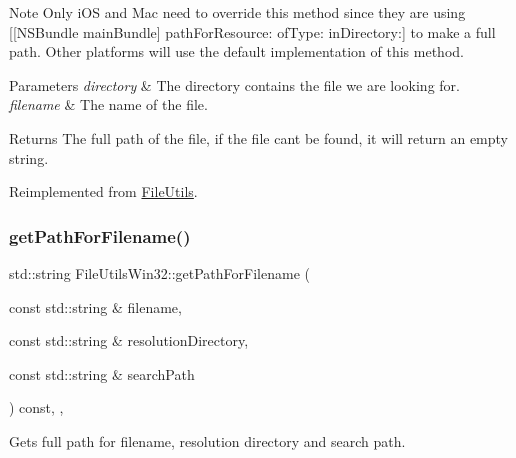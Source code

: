 \begin{DoxyNote}{Note}
Only i\+OS and Mac need to override this method since they are using {\ttfamily \mbox{[}\mbox{[}N\+S\+Bundle main\+Bundle\mbox{]} path\+For\+Resource\+: of\+Type\+: in\+Directory\+:\mbox{]}} to make a full path. Other platforms will use the default implementation of this method. 
\end{DoxyNote}

\begin{DoxyParams}{Parameters}
{\em directory} & The directory contains the file we are looking for. \\
\hline
{\em filename} & The name of the file. \\
\hline
\end{DoxyParams}
\begin{DoxyReturn}{Returns}
The full path of the file, if the file can\textquotesingle{}t be found, it will return an empty string. 
\end{DoxyReturn}


Reimplemented from \hyperlink{classFileUtils_aa6bae4977b0a23b40f5c4dfea7aee3ff}{File\+Utils}.

\mbox{\label{classFileUtilsWin32_a1a2b675bb9e51acc264bf1683a2c1a99}} 
\subsubsection{\texorpdfstring{get\+Path\+For\+Filename()}{getPathForFilename()}\hspace{0.1cm}{\footnotesize\ttfamily [1/2]}}
{\footnotesize\ttfamily std\+::string File\+Utils\+Win32\+::get\+Path\+For\+Filename (\begin{DoxyParamCaption}\item[{const std\+::string \&}]{filename,  }\item[{const std\+::string \&}]{resolution\+Directory,  }\item[{const std\+::string \&}]{search\+Path }\end{DoxyParamCaption}) const\hspace{0.3cm}{\ttfamily [override]}, {\ttfamily [protected]}, {\ttfamily [virtual]}}

Gets full path for filename, resolution directory and search path.


